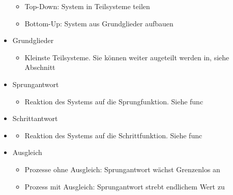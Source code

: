\documentclass[margin=normal]{tex/hsrzf}
\begin{document}
\begin{itemize}
\begin{itemize}
                  \item Top-Down: System in Teilsysteme teilen
                  \item Bottom-Up: System aus Grundglieder aufbauen
            \end{itemize}
      \item Grundglieder
            \begin{itemize}
                  \item Kleinste Teilsysteme. Sie können weiter augeteilt werden in, siehe Abschnitt 
            \end{itemize}
      \item Sprungantwort
            \begin{itemize}
                  \item Reaktion des Systems auf die Sprungfunktion. Siehe \refname{func}
                        
            \end{itemize}
      \item Schrittantwort
      \item \begin{itemize}
                  \item Reaktion des Systems auf die Schrittfunktion. Siehe \refname{func}
            \end{itemize}
      \item Ausgleich
            \begin{itemize}
                  \item Prozesse ohne Ausgleich: Sprungantwort wächst Grenzenlos an
                  \item Prozess mit Ausgleich: Sprungantwort strebt endlichem Wert zu
            \end{itemize}

\end{itemize}
\end{document}
